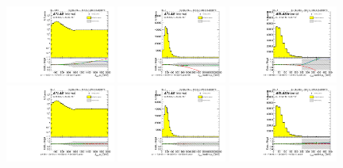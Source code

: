 \begin{figure}[htbp!]
\begin{center}
\includegraphics[angle=270, width=0.32\textwidth]{./figures/boosted/Reweight/Fits/Moriond_bkg_3_NoTag_3Trk_lead_Incl_sublHCand_Pt_m_1.pdf}
\includegraphics[angle=270, width=0.32\textwidth]{./figures/boosted/Reweight/Fits/Moriond_bkg_3_NoTag_3Trk_lead_Incl_sublHCand_trk0_Pt.pdf}
\includegraphics[angle=270, width=0.32\textwidth]{./figures/boosted/Reweight/Fits/Moriond_bkg_3_NoTag_3Trk_lead_Incl_sublHCand_trk1_Pt.pdf} \\
\includegraphics[angle=270, width=0.32\textwidth]{./figures/boosted/Reweight/Fits/Moriond_bkg_9_NoTag_3Trk_lead_Incl_sublHCand_Pt_m_1.pdf}
\includegraphics[angle=270, width=0.32\textwidth]{./figures/boosted/Reweight/Fits/Moriond_bkg_9_NoTag_3Trk_lead_Incl_sublHCand_trk0_Pt.pdf}
\includegraphics[angle=270, width=0.32\textwidth]{./figures/boosted/Reweight/Fits/Moriond_bkg_9_NoTag_3Trk_lead_Incl_sublHCand_trk1_Pt.pdf} \\

\end{center}
\end{figure}
